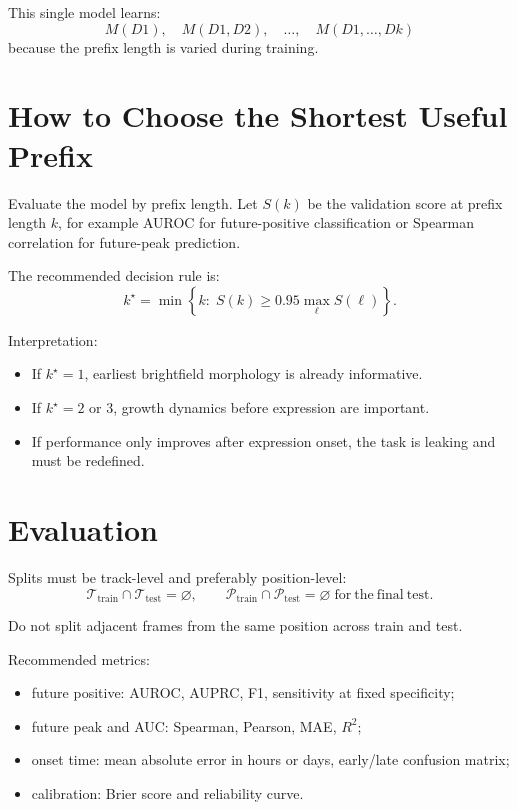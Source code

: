 \documentclass[11pt]{article}
\newcommand{\1}{\mathbf{1}}
\begin{document}
This single model learns:
\begin{equation}
M(D1),\quad M(D1,D2),\quad \ldots,\quad M(D1,\ldots,Dk)
\end{equation}
because the prefix length is varied during training.

\section{How to Choose the Shortest Useful Prefix}
Evaluate the model by prefix length. Let \(S(k)\) be the validation score at prefix length \(k\), for example AUROC for future-positive classification or Spearman correlation for future-peak prediction.

The recommended decision rule is:
\begin{equation}
k^\star =
\min\left\{
k:\; S(k) \ge 0.95\max_{\ell}S(\ell)
\right\}.
\end{equation}

Interpretation:
\begin{itemize}[leftmargin=1.5em]
  \item If \(k^\star=1\), earliest brightfield morphology is already informative.
  \item If \(k^\star=2\) or \(3\), growth dynamics before expression are important.
  \item If performance only improves after expression onset, the task is leaking and must be redefined.
\end{itemize}

\section{Evaluation}
Splits must be track-level and preferably position-level:
\begin{equation}
\mathcal{T}_{\mathrm{train}}\cap\mathcal{T}_{\mathrm{test}}=\varnothing,
\qquad
\mathcal{P}_{\mathrm{train}}\cap\mathcal{P}_{\mathrm{test}}=\varnothing
\;\mathrm{for\ the\ final\ test}.
\end{equation}

Do not split adjacent frames from the same position across train and test.

Recommended metrics:
\begin{itemize}[leftmargin=1.5em]
  \item future positive: AUROC, AUPRC, F1, sensitivity at fixed specificity;
  \item future peak and AUC: Spearman, Pearson, MAE, \(R^2\);
  \item onset time: mean absolute error in hours or days, early/late confusion matrix;
  \item calibration: Brier score and reliability curve.
\end{itemize}
\end{document}
